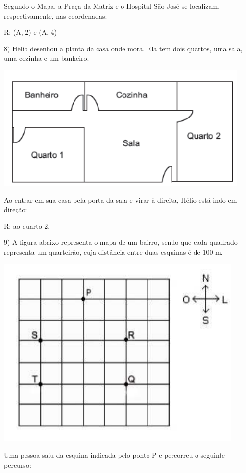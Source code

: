 Segundo o Mapa, a Praça da Matriz e o Hospital São José se localizam,
respectivamente, nas coordenadas:

R: (A, 2) e (A, 4)

8) Hélio desenhou a planta da casa onde mora. Ela tem dois quartos, uma
sala, uma cozinha e um banheiro.

\includegraphics[width=4.94792in,height=2.46875in]{./imgSAEB_6_MAT/media/image71.png}

Ao entrar em sua casa pela porta da sala e virar à direita, Hélio está
indo em direção:

R: ao quarto 2.

9) A figura abaixo representa o mapa de um bairro, sendo que cada
quadrado representa um quarteirão, cuja distância entre duas esquinas é
de 100 m.

\includegraphics[width=4.82569in,height=3.77917in]{./imgSAEB_6_MAT/media/image72.png}

Uma pessoa saiu da esquina indicada pelo ponto P e percorreu o seguinte
percurso:


